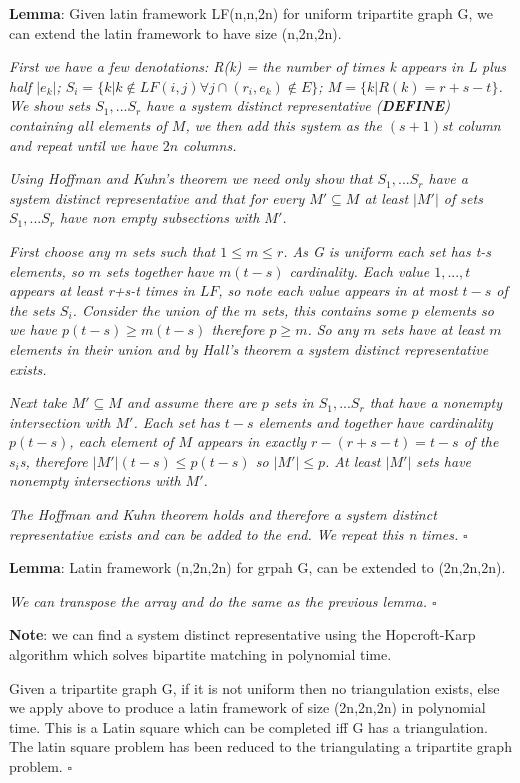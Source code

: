 \documentclass[a4paper,11pt]{report}
\newcounter{col}
\begin{document}
\textbf{Lemma}: Given latin framework LF(n,n,2n) for uniform tripartite graph G, we can extend the latin framework to have size
(n,2n,2n).

\textit{First we have a few denotations: R(k) = the number of times k appears in L plus half $|e_k|$; $S_i=\{k|k \not\in LF(i,j) \forall j \cap (r_i,e_k)\not\in E\}$; $M=\{k|R(k)=r+s-t\}$. We show sets $S_1,...S_r$ have a system distinct representative (\textbf{DEFINE}) containing all elements of $M$, we then add this system as the $(s+1)$st column and repeat until we have $2n$ columns.}

\textit{Using Hoffman and Kuhn's theorem \cite{hoffman} we need only show that $S_1,...S_r$ have a system distinct representative and that for every $M'\subseteq M$ at least $|M'|$ of sets $S_1,...S_r$ have non empty subsections with $M'$.}

\textit{First choose any $m$ sets such that $1\leq m \leq r$. As G is uniform each set has t-s elements, so $m$ sets together have $m(t-s)$ cardinality. Each value $1,...,t$ appears at least r+s-t times in $LF$, so note each value appears in at most $t-s$ of the sets $S_i$. Consider the union of the $m$ sets, this contains some $p$ elements so we have $p(t-s)\geq m(t-s)$ therefore $p\geq m$. So any $m$ sets have at least $m$ elements in their union and by Hall's theorem \cite{hall} a system distinct representative exists.}

\textit{Next take $M'\subseteq M$ and assume there are $p$ sets in $S_1,...S_r$ that have a nonempty intersection with $M'$. Each set has $t-s$ elements and together have cardinality $p(t-s)$, each element of $M$ appears in exactly $r-(r+s-t)=t-s$ of the $s_i$s, therefore $|M'|(t-s)\leq p(t-s)$ so $|M'|\leq p$. At least $|M'|$ sets have nonempty intersections with $M'$.}

\textit{The Hoffman and Kuhn theorem holds and therefore a system distinct representative exists and can be added to the end. We repeat this n times.} $\square$

\textbf{Lemma}: Latin framework (n,2n,2n) for grpah G, can be extended to (2n,2n,2n).

\textit{We can transpose the array and do the same as the previous lemma. $\square$}

\textbf{Note}: we can find a system distinct representative using the Hopcroft-Karp \cite{hopcroft} algorithm which solves bipartite matching in polynomial time. 

Given a tripartite graph G, if it is not uniform then no triangulation exists, else we apply above to produce a latin framework of size (2n,2n,2n) in polynomial time. This is a Latin square which can be completed iff G has a triangulation. The latin square problem has been reduced to the triangulating a tripartite graph problem. $\square$
\end{document}
